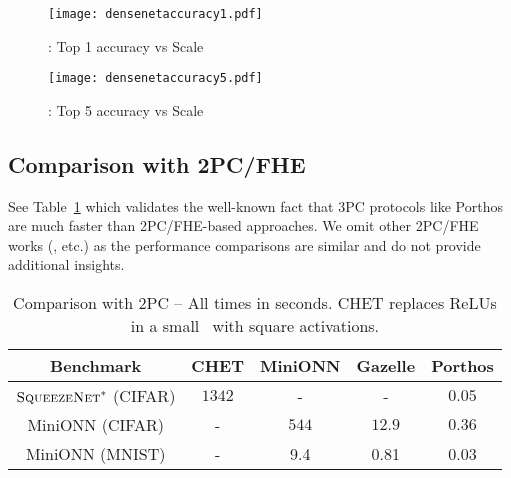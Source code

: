 \begin{figure}
  \texttt{[image: densenetaccuracy1.pdf]}
  \caption{\densenet: Top 1 accuracy vs Scale}
  \label{fig:densenetaccuracy1}
\end{figure}

\begin{figure}
  \texttt{[image: densenetaccuracy5.pdf]}
  \caption{\densenet: Top 5 accuracy vs Scale}
  \label{fig:densenetaccuracy5}
\end{figure}

\subsection{Comparison with 2PC/FHE}
\label{unfaircomp}
See Table~\ref{tab:porthosvspriorcifar10} which validates the well-known fact that 3PC protocols like Porthos are much faster than 2PC/FHE-based approaches.
We omit other 2PC/FHE works (\cite{secureml,ezpc,nhe,nhe2,delphi}, etc.) as the performance comparisons are similar and do not provide additional insights.
\begin{table}
  \centering

      \begin{tabular}{|c|c|c|c|c|}
    \hline
    Benchmark & CHET & MiniONN  & Gazelle & Porthos\\
    \hline
	$\textsc{SqueezeNet}^*$ (CIFAR) & $1342$ & - & - & $0.05$ \\
	\hline
    MiniONN (CIFAR) & - & $544$  & $12.9$ & $0.36$\\
	\hline
    MiniONN (MNIST) & - & 9.4  & 0.81 & 0.03\\
   \hline 
\end{tabular}
 \caption{Comparison with 2PC  -- All times in seconds. CHET replaces ReLUs in a small \squeezenet\ with square activations.}
\label{tab:porthosvspriorcifar10}
\end{table}

